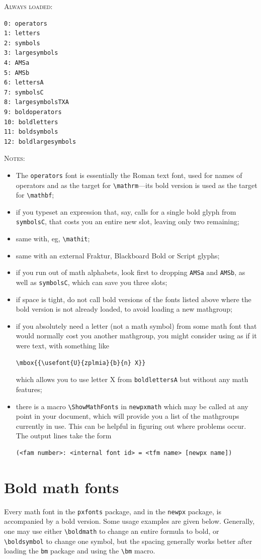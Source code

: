 \documentclass[11pt]{article}
\begin{document}
\textsc{Always loaded:}
\begin{verbatim}
0: operators
1: letters
2: symbols
3: largesymbols
4: AMSa
5: AMSb
6: lettersA
7: symbolsC
8: largesymbolsTXA
9: boldoperators
10: boldletters
11: boldsymbols
12: boldlargesymbols
\end{verbatim}
\textsc{Notes:}
\begin{itemize}
\item
The {\tt operators} font is essentially the Roman text font, used for names of operators and as the target for \verb|\mathrm|---its bold version is used as the target for \verb|\mathbf|;
\item if you typeset an expression that, say, calls for a single bold glyph from  {\tt symbolsC}, that costs you an entire new slot, leaving only two remaining;
\item same with, eg, \verb|\mathit|;
\item same with an external Fraktur, Blackboard Bold or Script glyphs;
\item if you run out of math alphabets, look first to dropping {\tt AMSa} and {\tt AMSb}, as well as {\tt symbolsC}, which can save you three slots;
\item if space is tight, do not call bold versions of the fonts listed above where the bold version is not already loaded, to avoid loading a new mathgroup; 
\item if you absolutely need a letter (not a math symbol) from some math font that would normally cost you another mathgroup, you might consider using as if it were text, with something like
\begin{verbatim}
\mbox{{\usefont{U}{zplmia}{b}{n} X}}
\end{verbatim}
which allows you to use letter X from {\tt boldlettersA} but without any math features;
\item there is a macro \verb|\ShowMathFonts| in {\tt newpxmath} which may be called at any point in your document, which will provide you a list of the mathgroups currently in use. This can be helpful in figuring out where problems occur. The output lines take the form
\begin{verbatim}
(<fam number>: <internal font id> = <tfm name> [newpx name])
\end{verbatim}

\end{itemize}
\section{Bold math fonts}\label{sec:boldmath}
Every math font in the {\tt pxfonts} package, and in the {\tt newpx} package, is accompanied by a bold version. Some usage examples are given below. Generally, one may use either \verb|\boldmath| to change an entire formula to bold, or \verb|\boldsymbol| to change one symbol, but the spacing generally works better after loading the {\tt bm} package and using the \verb|\bm| macro.
\end{document}
